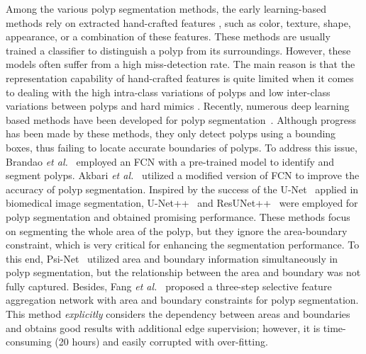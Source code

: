 \documentclass[runningheads]{llncs}
\def\etal{{\em et al.}}
\def\etal{{\em et al.~}}
\begin{document}
Among the various polyp segmentation methods, 
the early learning-based methods rely on extracted hand-crafted features \cite{mamonov2014automated,tajbakhsh2015automated}, such as color, texture, shape, appearance, or a combination of these features. These methods are usually trained a classifier to distinguish a polyp from its surroundings.  
However, these models often suffer from a high miss-detection rate. The main reason is that the representation capability of hand-crafted features is quite limited when it comes to dealing with the high intra-class variations of polyps and low inter-class variations between polyps and hard mimics \cite{yu2016integrating}. 
Recently, numerous deep learning based methods have been developed for polyp segmentation~\cite{yu2016integrating,zhang2018polyp}. Although progress has been made by these methods, they only detect polyps using a bounding boxes, thus failing to locate accurate boundaries of polyps. To address this issue, Brandao \etal \cite{brandao2017fully} employed an FCN with a pre-trained model to identify and segment polyps. Akbari \etal \cite{akbari2018polyp} utilized a modified version of FCN to improve the accuracy of polyp segmentation.
Inspired by the success of the U-Net~\cite{ronneberger2015u} applied in biomedical image segmentation, U-Net++~\cite{zhou2018unetplus} and ResUNet++~\cite{jha2019resunetplus} were employed for polyp segmentation and obtained promising performance. These methods focus on segmenting the whole area of the polyp, but they ignore the area-boundary constraint, which is very critical for enhancing the segmentation performance. To this end, Psi-Net~\cite{murugesan2019psi} utilized area and boundary information simultaneously in polyp segmentation, but the relationship between the area and boundary was not fully captured. Besides, Fang \etal \cite{fang2019selective} proposed a three-step selective feature aggregation network with area and boundary constraints for polyp segmentation. This method \textit{explicitly} considers the dependency between areas and boundaries and obtains good results with additional edge supervision; however, it is time-consuming (20 hours) and easily corrupted with over-fitting.
\end{document}

